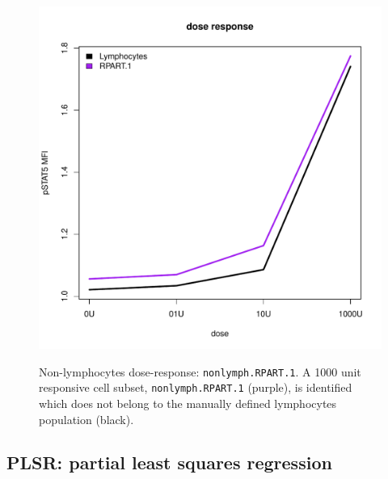 \begin{figure}
\begin{minipage}{.9\textwidth}
{  %
}
\end{minipage}
%
\begin{minipage}{.5\textwidth}
\includegraphics[width=\linewidth]{figures/rpart-nonlymphocytes-dose-response}
\end{minipage}
\begin{minipage}{.3\textwidth}
{ Non-lymphocytes dose-response: \texttt{nonlymph.RPART.1}. }
{
  A 1000 unit responsive cell subset, \texttt{nonlymph.RPART.1} (purple), is identified which does not belong to the manually defined lymphocytes population (black).
}
\end{minipage}
\end{figure}




\clearpage


\subsection{PLSR: partial least squares regression}

